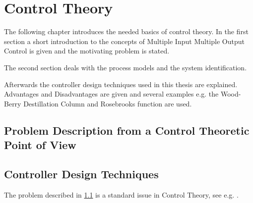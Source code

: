 \chapter{Control Theory}
\label{c:Control}

The following chapter introduces the needed basics of control theory.
In the first section a short introduction to the concepts of Multiple Input Multiple Output Control is 
given and the motivating problem is stated.

The second section deals with the process models and the system identification.

Afterwards the controller design techniques used in this thesis are explained.
Advantages and Disadvantages are given and several examples e.g. the Wood-Berry Destillation Column and Rosebrooks function are used. \par

\section{Problem Description from a Control Theoretic Point of View} %
\label{sec:Control:Problem}

\section{Controller Design Techniques}
\label{sec:Control:Design}

The problem described in \ref{sec:Control:Problem} is a standard issue in Control Theory, see e.g. \cite{Lunze2014}.


